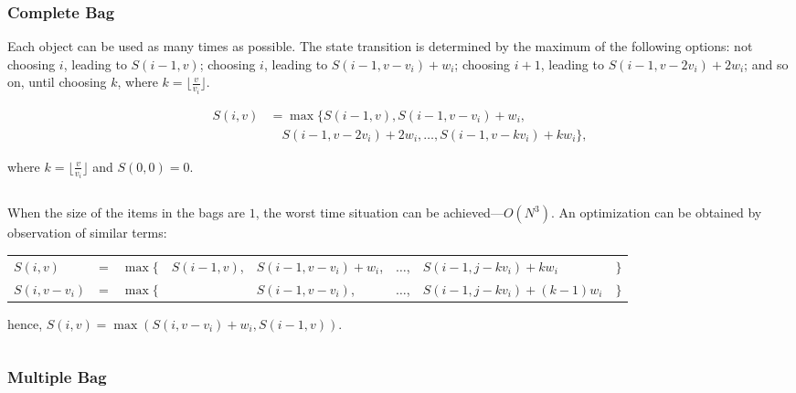 \documentclass{article}
\begin{document}
\subsubsection{Complete Bag}

Each object can be used as many times as possible. The state transition is determined by the maximum of the following options: not choosing $i$, leading to $S(i-1,v)$; choosing $i$, leading to $S(i-1,v-v_i)+w_i$; choosing $i+1$, leading to $S(i-1,v-2v_i)+2w_i$; and so on, until choosing $k$, where $k=\lfloor \frac{v}{v_i} \rfloor$.

\[
	\begin{split}
		S(i,v) &= \max \{ S(i-1,v), S(i-1,v-v_i)+w_i, \\
		&\quad S(i-1,v-2v_i)+2w_i, \ldots, S(i-1,v-kv_i)+kw_i \},
	\end{split}
\]

where $k = \lfloor \frac{v}{v_i} \rfloor$ and $S(0, 0) = 0$.

\begin{center}
	\inputminted[firstline=5]{cpp}{src/struct-rudimentary-complete.cpp}
\end{center}

When the size of the items in the bags are $1$, the worst time situation can be achieved---$O(N^3)$. An optimization can be obtained by observation of similar terms:
\begin{center}\vspace{-1em}
	\begin{tabular}{@{}llllllll@{}}
		$S(i, v)$       & = & $\max \{$ & $S(i - 1, v)$, & $S(i - 1, v - v_i) + w_i$, & $\ldots$, & $S(i - 1, j - k v_i) + k w_i$       & $\}$ \\
		$S(i, v - v_i)$ & = & $\max \{$ &                & $S(i - 1, v - v_i)$,       & $\ldots$, & $S(i - 1, j - k v_i) + (k - 1) w_i$ & $\}$
	\end{tabular}
\end{center}
hence, $S(i, v) = \max (S(i, v - v_i) + w_i, S(i - 1, v))$.

\begin{center}
	\inputminted[firstline=5]{cpp}{src/struct-complete-bag.cpp}
\end{center}

\subsubsection{Multiple Bag}
\end{document}
